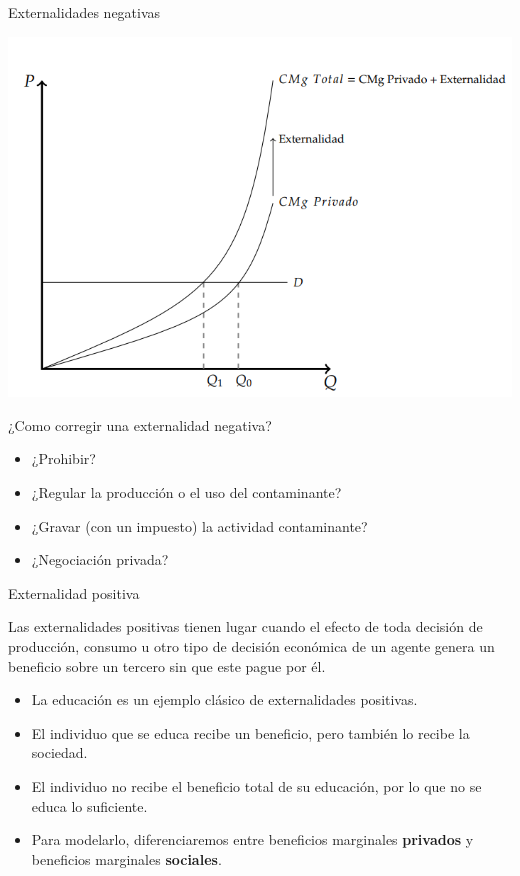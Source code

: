 \documentclass{beamer}
\begin{document}
\begin{frame}{Externalidades negativas}
    \begin{center}
        \includegraphics[scale=0.7]{../Figures/C25.2.png}
    \end{center}
\end{frame}

\begin{frame}{¿Como corregir una externalidad negativa?}
    \begin{itemize}
        \item ¿Prohibir?
        \item ¿Regular la producción o el uso del contaminante?
        \item ¿Gravar (con un impuesto) la actividad contaminante?
        \item ¿Negociación privada?
    \end{itemize}
\end{frame}

\begin{frame}{Externalidad positiva}
    \begin{boxA}
        Las externalidades positivas tienen lugar cuando el efecto de
        toda decisión de producción, consumo u otro tipo de decisión
        económica de un agente genera un beneficio sobre un tercero sin
        que este pague por él.
    \end{boxA}
    \begin{itemize}
        \item La educación es un ejemplo clásico de externalidades positivas.
        \item El individuo que se educa recibe un beneficio, pero también lo recibe la sociedad.
        \item El individuo no recibe el beneficio total de su educación, por lo que no se educa lo suficiente.
        \item Para modelarlo, diferenciaremos entre beneficios marginales \textbf{privados} y beneficios marginales \textbf{sociales}.
    \end{itemize}
\end{frame}
\end{document}
